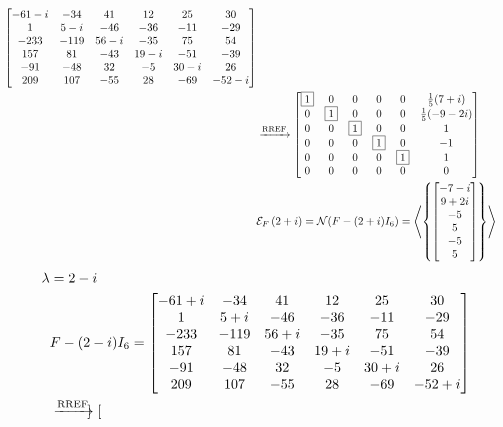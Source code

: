\documentclass{ximera}
\begin{document}
\begin{example}
\begin{align*}
\begin{bmatrix}
               -61-i & -34 & 41 & 12 & 25 & 30\\
               1 & 5-i & -46 & -36 & -11 & -29\\
               -233 & -119 & 56-i & -35 & 75 & 54\\
               157 & 81 & -43 & 19-i & -51 & -39\\
               -91 & -48 & 32 & -5 & 30-i & 26\\
               209 & 107 & -55 & 28 & -69 & -52-i
             \end{bmatrix}\\
           &
             \xrightarrow{\text{RREF}}
             \begin{bmatrix}
               \fbox{1} & 0 & 0 & 0 & 0 & \frac{1}{5}(7+ i)\\
               0 & \fbox{1} & 0 & 0 & 0 & \frac{1}{5}(-9-2i)\\
               0 & 0 & \fbox{1} & 0 & 0 & 1\\
               0 & 0 & 0 & \fbox{1} & 0 & -1\\
               0 & 0 & 0 & 0 & \fbox{1} & 1\\
               0 & 0 & 0 & 0 & 0 & 0
             \end{bmatrix}\\
           &\mathcal{E}_{F}\left(2+i\right)=\mathcal{N}\!\left(F-(2+i)I_6\right)
             =\left\langle\left\{\begin{bmatrix}-7-i\\9+2i\\-5\\5\\-5\\5\end{bmatrix}\right\}\right\rangle\\
  \end{align*}
  \begin{align*}
    \lambda&=2-i\\
           &F-(2-i)I_6=
             \begin{bmatrix}
               -61+i & -34 & 41 & 12 & 25 & 30\\
               1 & 5+i & -46 & -36 & -11 & -29\\
               -233 & -119 & 56+i & -35 & 75 & 54\\
               157 & 81 & -43 & 19+i & -51 & -39\\
               -91 & -48 & 32 & -5 & 30+i & 26\\
               209 & 107 & -55 & 28 & -69 & -52+i
             \end{bmatrix}\\
           &\xrightarrow{\text{RREF}}
             \begin{bmatrix}

\end{bmatrix}
\end{align*}
\end{example}
\end{document}
